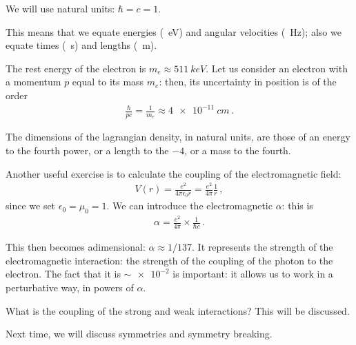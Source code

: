 \documentclass[main.tex]{subfiles}
\begin{document}
We will use natural units: \(\hbar = c = 1\). 

This means that we equate energies (\SI{}{eV}) and angular velocities (\SI{}{Hz}); also we equate times (\SI{}{s}) and lengths (\SI{}{m}). 

The rest energy of the electron is \(m_e \approx \SI{511}{keV}\).
Let us consider an electron with a momentum \(p\) equal to its mass \(m_e\): then, its uncertainty in position is of the order 
%
\begin{align}
\frac{\hbar}{p c} = \frac{1}{m_e} \approx \SI{4e-11}{cm}
\,.
\end{align}

The dimensions of the lagrangian density, in natural units, are those of an energy to the fourth power, or a length to the \(-4\), or a mass to the fourth. 

Another useful exercise is to calculate the coupling of the electromagnetic field: 
%
\begin{align}
V(r) = \frac{e^2}{4 \pi \epsilon_{0} r} = \frac{e^2}{4 \pi } \frac{1}{r} 
\,,
\end{align}
%
since we set \(\epsilon_{0} = \mu_0 = 1\). 
We can introduce the electromagnetic \(\alpha \): this is 
%
\begin{align}
\alpha = \frac{e^2}{4 \pi } \times \frac{1}{\hbar c} 
\,.
\end{align}

This then becomes adimensional: \(\alpha \approx 1 / 137\). 
It represents the strength of the electromagnetic interaction: the strength of the coupling of the photon to the electron.  
The fact that it is \(\sim \num{e-2}\) is important: it allows us to work in a perturbative way, in powers of \(\alpha \). 

What is the coupling of the strong and weak interactions? This will be discussed.

Next time, we will discuss symmetries and symmetry breaking. 
\end{document}

